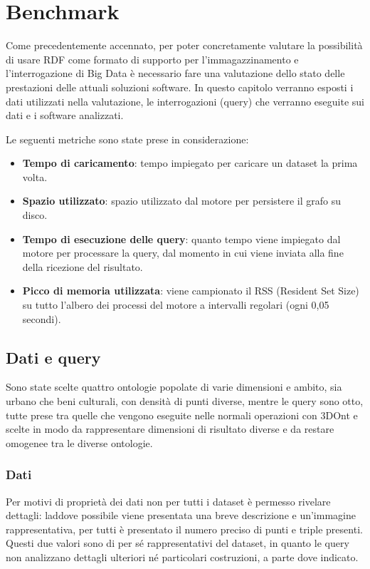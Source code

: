 \chapter{Benchmark}
\label{cha:benchmark}

Come precedentemente accennato, per poter concretamente valutare la possibilità di usare RDF come formato di supporto per
l'immagazzinamento e l'interrogazione di Big Data è necessario fare una valutazione dello stato delle prestazioni delle
attuali soluzioni software. In questo capitolo verranno esposti i dati utilizzati nella valutazione, le interrogazioni (query)
che verranno eseguite sui dati e i software analizzati.
\par
Le seguenti metriche sono state prese in considerazione:

\begin{itemize}
\item \textbf{Tempo di caricamento}: tempo impiegato per caricare un dataset la prima volta.
\item \textbf{Spazio utilizzato}: spazio utilizzato dal motore per persistere il grafo su disco.
\item \textbf{Tempo di esecuzione delle query}: quanto tempo viene impiegato dal motore per processare la query, dal momento in cui
viene inviata alla fine della ricezione del risultato.
\item \textbf{Picco di memoria utilizzata}: viene campionato il RSS (Resident Set Size) su tutto l'albero dei processi 
del motore a intervalli regolari (ogni 0,05 secondi).
\end{itemize}

\section{Dati e query}
\label{sec:data_query}

Sono state scelte quattro ontologie popolate di varie dimensioni e ambito, sia urbano che beni culturali, con densità di punti diverse,
mentre le query sono otto, tutte prese tra quelle che vengono eseguite nelle normali operazioni con 3DOnt e scelte in modo da
rappresentare dimensioni di risultato diverse e da restare omogenee tra le diverse ontologie.

\subsection{Dati}

Per motivi di proprietà dei dati non per tutti i dataset è permesso rivelare dettagli: laddove possibile viene presentata una
breve descrizione e un'immagine rappresentativa, per tutti è presentato il numero preciso di punti e triple presenti.
Questi due valori sono di per sé rappresentativi del dataset, in quanto le query non analizzano dettagli ulteriori
né particolari costruzioni, a parte dove indicato.

